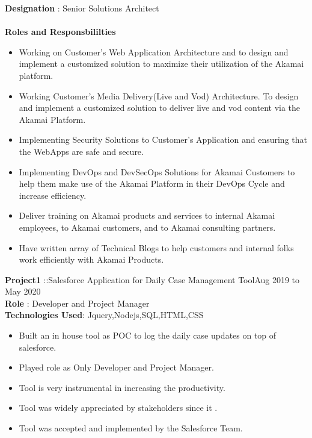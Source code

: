 \documentclass{resumeclass}
\begin{document}
\begin{resume}
  \textbf{Designation} : Senior Solutions Architect \\ \\
  \textbf{Roles and Responsbililties} 
   \begin{itemize} \itemsep -2pt
    \item Working on Customer’s Web Application Architecture and to design and implement a customized solution to maximize their utilization of the Akamai platform.
    \item Working Customer’s Media Delivery(Live and Vod) Architecture. To design and implement a customized solution to deliver live and vod content via the Akamai Platform.
    \item Implementing Security Solutions to Customer’s Application and ensuring that the WebApps are safe and secure.
    \item Implementing DevOps and DevSecOps Solutions for Akamai Customers to help them make use of the Akamai Platform in their DevOps Cycle and increase efficiency.
    \item Deliver training on Akamai products and services to internal Akamai employees, to Akamai customers, and to Akamai consulting partners.
    \item Have written array of Technical Blogs to help customers and internal folks work efficiently with Akamai Products.
  \end{itemize} \vspace{-6pt}
  
  
  \textbf{Project1} ::Salesforce Application for Daily Case Management Tool\hfill      Aug 2019 to May 2020 \\
  \textbf{Role} : Developer and Project Manager\\
  \textbf{Technologies Used}: Jquery,Nodejs,SQL,HTML,CSS
  
   \begin{itemize} \itemsep -2pt
    \item Built an in house tool as POC to log the daily case updates on top of salesforce. 
    \item Played role as Only Developer and Project Manager. 
    \item Tool is very instrumental in increasing the productivity.
    \item Tool was widely appreciated by stakeholders since it .
    \item Tool was accepted and implemented by the Salesforce Team.
  \end{itemize} \vspace{-6pt}


\end{resume}
\end{document}
